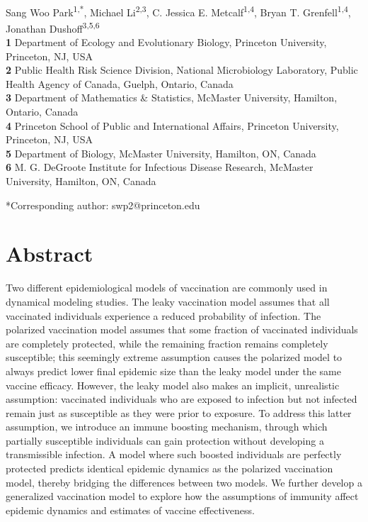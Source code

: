 \documentclass[12pt]{article}
\date{\today}
\begin{document}
\begin{flushleft}{
	\Large
	\textbf{}
}
\newline
\\
Sang Woo Park\textsuperscript{1,*}, Michael Li\textsuperscript{2,3}, C. Jessica E. Metcalf\textsuperscript{1,4}, Bryan T. Grenfell\textsuperscript{1,4}, Jonathan Dushoff\textsuperscript{3,5,6}
\\
\bigskip
\textbf{1} Department of Ecology and Evolutionary Biology, Princeton University, Princeton, NJ, USA\\
\textbf{2} Public Health Risk Science Division, National Microbiology Laboratory, Public Health Agency of Canada, Guelph, Ontario, Canada\\
\textbf{3} Department of Mathematics \& Statistics, McMaster University, Hamilton, Ontario, Canada\\
\textbf{4} Princeton School of Public and International Affairs, Princeton University, Princeton, NJ, USA\\
\textbf{5} Department of Biology, McMaster University, Hamilton, ON, Canada\\
\textbf{6} M. G. DeGroote Institute for Infectious Disease Research, McMaster University, Hamilton, ON, Canada\\
\bigskip

*Corresponding author: swp2@princeton.edu
\end{flushleft}

\section*{Abstract}

Two different epidemiological models of vaccination are commonly used in dynamical modeling studies.
The leaky vaccination model assumes that all vaccinated individuals experience a reduced probability of infection.
The polarized vaccination model assumes that some fraction of vaccinated individuals are completely protected, while the remaining fraction remains completely susceptible;
this seemingly extreme assumption causes the polarized model to always predict lower final epidemic size than the leaky model under the same vaccine efficacy.
However, the leaky model also makes an implicit, unrealistic assumption: 
vaccinated individuals who are exposed to infection but not infected remain just as susceptible as they were prior to exposure.
To address this latter assumption, we introduce an immune boosting mechanism, through which partially susceptible individuals can gain protection without developing a transmissible infection.
A model where such boosted individuals are perfectly protected predicts identical epidemic dynamics as the polarized vaccination model, thereby bridging the differences between two models.
We further develop a generalized vaccination model to explore how the assumptions of immunity affect epidemic dynamics and estimates of vaccine effectiveness.
\end{document}
